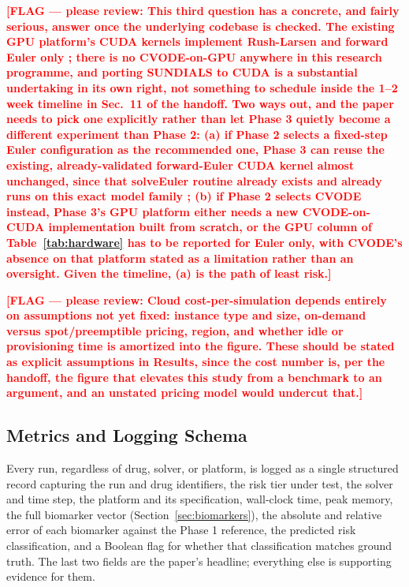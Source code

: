 \documentclass[journal]{IEEEtran}
\newcommand{\flag}[1]{\textcolor{red}{\textbf{[FLAG --- please review: #1]}}}
\begin{document}
\flag{This third question has a concrete, and fairly serious, answer once the underlying codebase is checked. The existing GPU platform's CUDA kernels implement Rush-Larsen and forward Euler only \cite{pramawijaya2024thesis}; there is no CVODE-on-GPU anywhere in this research programme, and porting SUNDIALS to CUDA is a substantial undertaking in its own right, not something to schedule inside the 1--2 week timeline in Sec.~11 of the handoff. Two ways out, and the paper needs to pick one explicitly rather than let Phase 3 quietly become a different experiment than Phase 2: (a) if Phase 2 selects a fixed-step Euler configuration as the recommended one, Phase 3 can reuse the existing, already-validated forward-Euler CUDA kernel almost unchanged, since that solveEuler routine already exists and already runs on this exact model family \cite{pramawijaya2024thesis}; (b) if Phase 2 selects CVODE instead, Phase 3's GPU platform either needs a new CVODE-on-CUDA implementation built from scratch, or the GPU column of Table~\ref{tab:hardware} has to be reported for Euler only, with CVODE's absence on that platform stated as a limitation rather than an oversight. Given the timeline, (a) is the path of least risk.}

\flag{Cloud cost-per-simulation depends entirely on assumptions not yet fixed: instance type and size, on-demand versus spot/preemptible pricing, region, and whether idle or provisioning time is amortized into the figure. These should be stated as explicit assumptions in Results, since the cost number is, per the handoff, the figure that elevates this study from a benchmark to an argument, and an unstated pricing model would undercut that.}

\subsection{Metrics and Logging Schema}
\label{sec:logging}

Every run, regardless of drug, solver, or platform, is logged as a single structured record capturing the run and drug identifiers, the risk tier under test, the solver and time step, the platform and its specification, wall-clock time, peak memory, the full biomarker vector (Section~\ref{sec:biomarkers}), the absolute and relative error of each biomarker against the Phase 1 reference, the predicted risk classification, and a Boolean flag for whether that classification matches ground truth. The last two fields are the paper's headline; everything else is supporting evidence for them.
\end{document}
